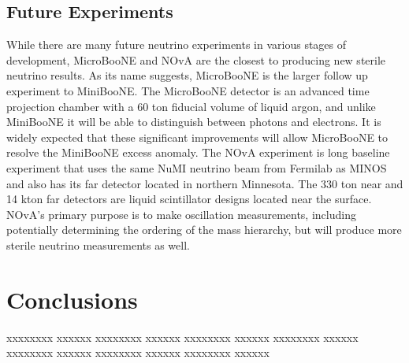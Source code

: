 \documentclass[aps,prd,twocolumn,nofootinbib]{revtex4-1}
\begin{document}
\subsection{Future Experiments}
While there are many future neutrino experiments in various stages of development, MicroBooNE and NOvA are the closest to producing new sterile neutrino results. As its name suggests, MicroBooNE is the larger follow up experiment to MiniBooNE. The MicroBooNE detector is an advanced time projection chamber with a 60 ton fiducial volume of liquid argon, and unlike MiniBooNE it will be able to distinguish between photons and electrons. It is widely expected that these significant improvements will allow MicroBooNE to resolve the MiniBooNE excess anomaly. The NOvA experiment is long baseline experiment that uses the same NuMI neutrino beam from Fermilab as MINOS and also has its far detector located in northern Minnesota. The 330 ton near and 14 kton far detectors are liquid scintillator designs located near the surface. NOvA's primary purpose is to make oscillation measurements, including potentially determining the ordering of the mass hierarchy, but will produce more sterile neutrino measurements as well.

\section{Conclusions}
xxxxxxxx xxxxxx xxxxxxxx xxxxxx xxxxxxxx xxxxxx xxxxxxxx xxxxxx xxxxxxxx xxxxxx xxxxxxxx xxxxxx xxxxxxxx xxxxxx
\end{document}
